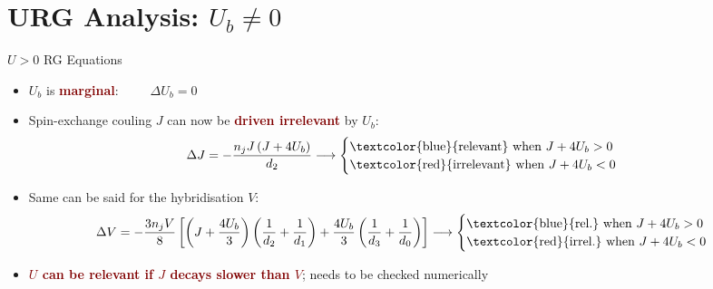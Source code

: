 \documentclass[aspectratio=169]{beamer}
\newcommand{\focus}[1]{\textcolor{maroon}{\textbf{#1}}}
\begin{document}
\section{URG Analysis: \(U_b \neq 0\)}

\begin{frame}[noframenumbering]{\(U > 0\) RG Equations}

\begin{itemize}
	\item \(U_b\) is \focus{marginal}: ~ ~ ~\(\Delta U_b = 0\)
	\item Spin-exchange couling \(J\) can now be \focus{driven irrelevant} by \(U_b\): 
	\begin{equation*}
	\Delta J = -\frac{n_j J\left(J + 4U_b\right)}{d_2} \longrightarrow \begin{cases}
	\text{\textcolor{blue}{relevant} when }J+4U_b > 0\\
	\text{\textcolor{red}{irrelevant} when }J+4U_b < 0\\
	\end{cases}
	\end{equation*}
	\item Same can be said for the hybridisation \(V\):
	\begin{equation*}
	\Delta V = -\frac{3n_j V}{8}\left[\left(J + \frac{4U_b}{3}\right) \left(\frac{1}{d_2} + \frac{1}{d_1}\right) + \frac{4U_b}{3}\left(\frac{1}{d_3} + \frac{1}{d_0}\right)\right] \longrightarrow \begin{cases}
	\text{\textcolor{blue}{rel.} when }J+4U_b > 0\\
	\text{\textcolor{red}{irrel.} when }J+4U_b < 0\\
	\end{cases}
	\end{equation*}
	\item \focus{\(U\) can be relevant if \(J\) decays slower than \(V\)}; needs to be checked numerically
\end{itemize}
\end{frame}
\end{document}
